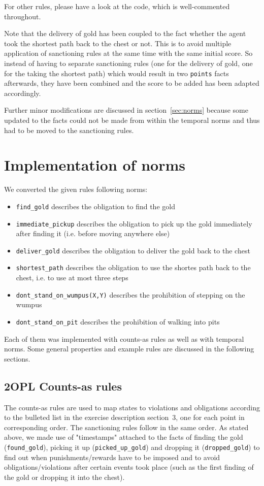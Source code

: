 \documentclass[a4paper,11pt]{article}
\begin{document}
For other rules, please have a look at the code, which is well-commented throughout.

Note that the delivery of gold has been coupled to the fact whether the agent took the shortest path back to the chest or not. This is to avoid multiple application of sanctioning rules at the same time with the same initial score. So instead of having to separate sanctioning rules (one for the delivery of gold, one for the taking the shortest path) which would result in two \texttt{points} facts afterwards, they have been combined and the score to be added has been adapted accordingly.

Further minor modifications are discussed in section~\ref{sec:norms} because some updated to the facts could not be made from within the temporal norms and thus had to be moved to the sanctioning rules.

\section{Implementation of norms}
We converted the given rules following norms:
\begin{itemize}
  \item \texttt{find\_gold} describes the obligation to find the gold
  \item \texttt{immediate\_pickup} describes the obligation to pick up the gold immediately after finding it (i.e. before moving anywhere else)
  \item \texttt{deliver\_gold} describes the obligation to deliver the gold back to the chest
  \item \texttt{shortest\_path} describes the obligation to use the shortes path back to the chest, i.e. to use at most three steps
  \item \texttt{dont\_stand\_on\_wumpus(X,Y)} describes the prohibition of stepping on the wumpus
  \item \texttt{dont\_stand\_on\_pit} describes the prohibition of walking into pits
\end{itemize}

Each of them was implemented with counts-as rules as well as with temporal norms. Some general properties and example rules are discussed in the following sections.

\subsection{2OPL Counts-as rules}
\label{sec:counts}
The counts-as rules are used to map states to violations and obligations according to the bulleted list in the exercise description section~3, one for each point in corresponding order. The sanctioning rules follow in the same order. As stated above, we made use of "timestamps" attached to the facts of finding the gold (\texttt{found\_gold}), picking it up (\texttt{picked\_up\_gold}) and dropping it (\texttt{dropped\_gold}) to find out when punishments/rewards have to be imposed and to avoid obligations/violations after certain events took place (such as the first finding of the gold or dropping it into the chest).
\end{document}
